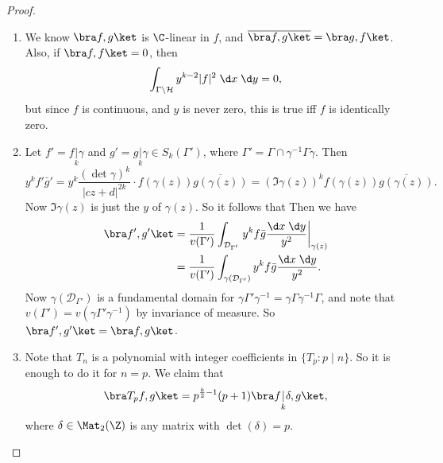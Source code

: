 \documentclass[a4paper]{article}
\renewcommand{\H}{\mathcal{H}}
\begin{document}
\begin{proof}\leavevmode
  \begin{enumerate}
    \item We know $\bra f, g\ket$ is $\C$-linear in $f$, and $\overline{\bra f, g\ket} = \bra g, f\ket$. Also, if $\bra f, f \ket = 0$, then
      \[
        \int_{\Gamma \setminus \H} y^{k - 2} |f|^2 \;\d x \;\d y = 0,
      \]
      but since $f$ is continuous, and $y$ is never zero, this is true iff $f$ is identically zero.
    \item Let $f' = f\underset{k}{|} \gamma$ and $g' = g \underset{k}{|}\gamma \in S_k(\Gamma')$, where $\Gamma' = \Gamma \cap \gamma^{-1} \Gamma \gamma$. Then
      \[
        y^k f' \bar{g}' = y^k \frac{(\det \gamma)^k}{|cz + d|^{2k}} \cdot f(\gamma(z)) \overline{g(\gamma(z))} = (\Im \gamma(z))^k f(\gamma(z)) \overline{g(\gamma(z))}.
      \]
      Now $\Im \gamma(z)$ is just the $y$ of $\gamma(z)$. So it follows that
      Then we have
      \begin{align*}
        \bra f', g'\ket &= \frac{1}{v(\Gamma')} \int_{\mathcal{D}_{\Gamma'}} \left.y^k f \bar{g} \frac{\d x\;\d y}{y^2}\right|_{\gamma(z)} \\
        &= \frac{1}{v(\Gamma')} \int_{\gamma(\mathcal{D}_{\Gamma'})} y^k f \bar{g} \frac{\d x\;\d y}{y^2}.
      \end{align*}
      Now $\gamma(\mathcal{D}_{\Gamma'})$ is a fundamental domain for $\gamma \Gamma'\gamma^{-1} = \gamma \Gamma \gamma^{-1} \Gamma$, and note that $v(\Gamma') = v(\gamma \Gamma' \gamma^{-1})$ by invariance of measure. So $\bra f', g'\ket = \bra f, g\ket$.
    \item Note that $T_n$ is a polynomial with integer coefficients in $\{T_p : p \mid n\}$. So it is enough to do it for $n = p$. We claim that
      \[
        \bra T_p f, g\ket = p^{\frac{k}{2} - 1} (p + 1) \bra f\underset{k}{|} \delta, g\ket,
      \]
      where $\delta \in \Mat_2(\Z)$ is any matrix with $\det (\delta) = p$.


\end{enumerate}
\end{proof}
\end{document}
